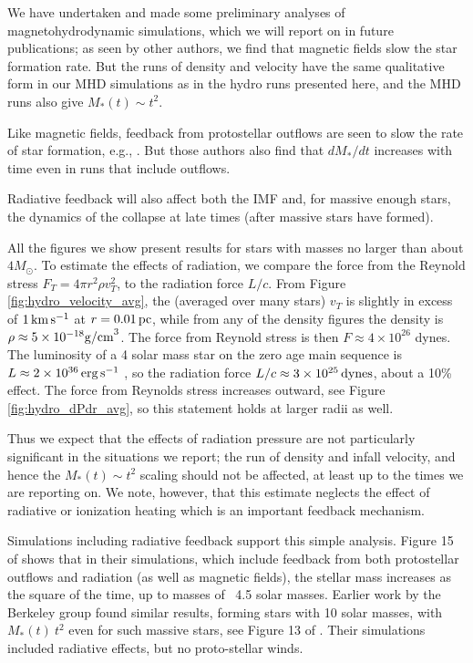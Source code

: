 \documentclass[../dissertation.tex]{subfiles}
\begin{document}
We have undertaken and made some preliminary analyses of magnetohydrodynamic simulations, which we will report on in future publications; as seen by other authors, we find that magnetic fields slow the star formation rate. But the runs of density and velocity have the same qualitative form in our MHD simulations as in the hydro runs presented here, and the MHD runs also give $M_*(t)\sim t^2$. 

Like magnetic fields, feedback from protostellar outflows are seen to slow the rate of star formation, e.g., \citet{2010ApJ...709...27W,2015MNRAS.450.4035F}. But those authors also find that $dM_*/dt$ increases with time even in runs that include outflows. 

Radiative feedback will also affect both the IMF and, for massive enough stars, the dynamics of the collapse at late times (after massive stars have formed). 

All the figures we show present results for stars with masses no larger than about $4 M_\odot$. To estimate the effects of radiation, we compare the force from the Reynold stress $F_T=4\pi r^2 \rho v_T^2$, to the radiation force $L/c$. 
From Figure \ref{fig:hydro_velocity_avg}, the (averaged over many stars) $v_T$ is slightly in excess of $1\,\rm km\,s^{-1}$ at $r=0.01\,\rm pc$, while from any of the density figures the density is $\rho\approx5\times10^{-18} {\rm g/cm}^3$. The force from Reynold stress is then $F\approx4\times 10^{26}$ dynes. The luminosity of a 4 solar mass star on the zero age main sequence is $L\approx 2\times10^{36}\,\rm erg\, s^{-1}$ \citep{1992A&AS...96..269S}, so the radiation force $L/c \approx 3\times10^{25}\,{\rm dynes}$, about a 10\% effect.  The force from Reynolds stress increases outward, see Figure \ref{fig:hydro_dPdr_avg}, so this statement holds at larger radii as well. 

Thus we expect that the effects of radiation pressure are not particularly significant in the situations we report;  the run of density and infall velocity, and hence the $M_*(t)\sim t^2$ scaling should not be affected, at least up to the times we are reporting on.  We note, however, that this estimate neglects the effect of radiative or ionization heating which is an important feedback mechanism.

Simulations including radiative feedback support this simple analysis. Figure 15 of  \citet{2014MNRAS.439.3420M} shows that in their simulations, which include feedback from both protostellar outflows and radiation (as well as magnetic fields), the stellar mass increases as the square of the time, up to masses of ~4.5 solar masses. Earlier work by the Berkeley group found similar results, forming stars with 10 solar masses, with $M_*(t)~ t^2$ even for such massive stars, see Figure 13 of \citet{2012ApJ...754...71K}. Their simulations included radiative effects, but no proto-stellar winds. 
\end{document}
